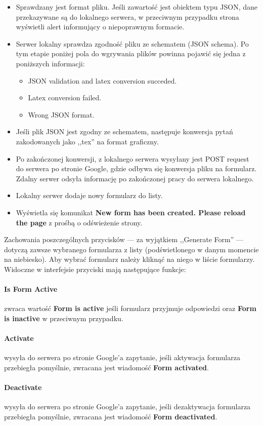 \begin{itemize}
\item Sprawdzany jest format  pliku. Jeśli zawartość jest obiektem typu JSON, dane przekazywane są do lokalnego serwera, w przeciwnym przypadku strona wyświetli alert informujący o niepoprawnym formacie.
\item Serwer lokalny sprawdza zgodność pliku ze schematem (JSON schema). Po tym etapie poniżej pola do wgrywania plików powinna pojawić się jedna z poniższych informacji:
\begin{itemize}
\item JSON validation and latex conversion succeded.
\item Latex conversion failed.
\item Wrong JSON format.
\end{itemize}
\item Jeśli plik JSON jest zgodny ze schematem, następuje konwersja pytań zakodowanych jako ,,tex'' na format graficzny. 
\item Po zakończonej konwersji, z lokalnego serwera wysyłany jest POST request do serwera po stronie Google, gdzie odbywa się konwersja pliku na formularz. Zdalny serwer odsyła informację po zakończonej pracy do serwera lokalnego.
\item Lokalny serwer dodaje nowy formularz do listy.
\item Wyświetla się komunikat \textbf{New form has been created. Please reload the page} z prośbą o odświeżenie strony.
\end{itemize}
\ind Zachowania poszczególnych przycisków  --- za wyjątkiem ,,Generate Form'' --- dotyczą zawsze wybranego formularza z listy (podświetlonego w danym momencie na niebiesko). Aby wybrać formularz należy kliknąć na niego w liście formularzy. 
\ind Widoczne w interfejsie przyciski mają następujące funkcje:
\paragraph{Is Form Active} zwraca wartość \textbf{Form is active} jeśli formularz przyjmuje odpowiedzi oraz \textbf{Form is inactive} w przeciwnym przypadku.
\paragraph{Activate} wysyła do serwera po stronie Google'a zapytanie, jeśli aktywacja formularza przebiegła pomyślnie, zwracana jest wiadomość \textbf{Form activated}.
\paragraph{Deactivate} wysyła do serwera po stronie Google'a zapytanie, jeśli dezaktywacja formularza przebiegła pomyślnie, zwracana jest wiadomość \textbf{Form deactivated}.
